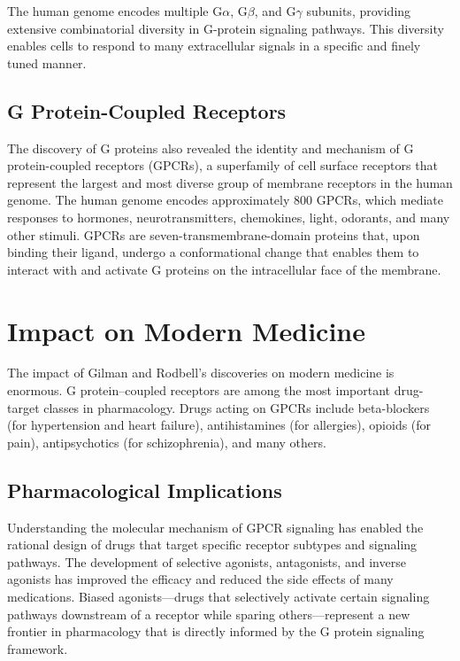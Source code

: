 The human genome encodes multiple G$\alpha$, G$\beta$, and G$\gamma$ subunits, providing extensive combinatorial diversity in G-protein signaling pathways. This diversity enables cells to respond to many extracellular signals in a specific and finely tuned manner.

\subsection{G Protein-Coupled Receptors}

The discovery of G proteins also revealed the identity and mechanism of G protein-coupled receptors (GPCRs), a superfamily of cell surface receptors that represent the largest and most diverse group of membrane receptors in the human genome. The human genome encodes approximately 800 GPCRs, which mediate responses to hormones, neurotransmitters, chemokines, light, odorants, and many other stimuli. GPCRs are seven-transmembrane-domain proteins that, upon binding their ligand, undergo a conformational change that enables them to interact with and activate G proteins on the intracellular face of the membrane.

\section{Impact on Modern Medicine}

The impact of Gilman and Rodbell's discoveries on modern medicine is enormous. G protein--coupled receptors are among the most important drug-target classes in pharmacology. Drugs acting on GPCRs include beta-blockers (for hypertension and heart failure), antihistamines (for allergies), opioids (for pain), antipsychotics (for schizophrenia), and many others.

\subsection{Pharmacological Implications}

Understanding the molecular mechanism of GPCR signaling has enabled the rational design of drugs that target specific receptor subtypes and signaling pathways. The development of selective agonists, antagonists, and inverse agonists has improved the efficacy and reduced the side effects of many medications. Biased agonists---drugs that selectively activate certain signaling pathways downstream of a receptor while sparing others---represent a new frontier in pharmacology that is directly informed by the G protein signaling framework.


